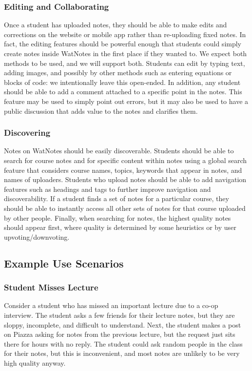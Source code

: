 \documentclass[12pt]{article}
\begin{document}
  \subsubsection{Editing and Collaborating}
  Once a student has uploaded notes, they should be able to make edits and corrections on the website or mobile app rather than re-uploading fixed notes. In fact, the editing features should be powerful enough that students could simply create notes inside WatNotes in the first place if they wanted to. We expect both methods to be used, and we will support both. Students can edit by typing text, adding images, and possibly by other methods such as entering equations or blocks of code: we intentionally leave this open-ended. In addition, any student should be able to add a comment attached to a specific point in the notes. This feature may be used to simply point out errors, but it may also be used to have a public discussion that adds value to the notes and clarifies them.
  \subsubsection{Discovering}
  Notes on WatNotes should be easily discoverable. Students should be able to search for course notes and for specific content within notes using a global search feature that considers course names, topics, keywords that appear in notes, and names of uploaders. Students who upload notes should be able to add navigation features such as headings and tags to further improve navigation and discoverability. If a student finds a set of notes for a particular course, they should be able to instantly access all other sets of notes for that course uploaded by other people. Finally, when searching for notes, the highest quality notes should appear first, where quality is determined by some heuristics or by user upvoting/downvoting.
\subsection{Example Use Scenarios}
  \subsubsection{Student Misses Lecture}
  Consider a student who has missed an important lecture due to a co-op interview. The student asks a few friends for their lecture notes, but they are sloppy, incomplete, and difficult to understand. Next, the student makes a post on Piazza asking for notes from the previous lecture, but the request just sits there for hours with no reply. The student could ask random people in the class for their notes, but this  is inconvenient, and most notes are unlikely to be very high quality anyway. \\
\end{document}
